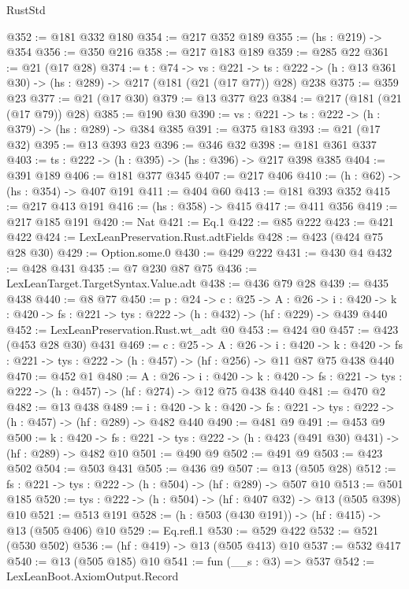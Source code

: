 \begin{lexlean}{RustStd}
\begin{coremodule}
@352 := @181 @332 @180
@354 := @217 @352 @189
@355 := (hs : @219) -> @354
@356 := @350 @216
@358 := @217 @183 @189
@359 := @285 @22
@361 := @21 (@17 @28)
@374 := {t : @74} ->
  {vs : @221} ->
  {ts : @222} -> (h : @13 @361 @30) -> (hs : @289) -> @217 (@181 (@21 (@17 @77)) @28) @238
@375 := @359 @23
@377 := @21 (@17 @30)
@379 := @13 @377 @23
@384 := @217 (@181 (@21 (@17 @79)) @28)
@385 := @190 @30
@390 := {vs : @221} -> {ts : @222} -> (h : @379) -> (hs : @289) -> @384 @385
@391 := @375 @183
@393 := @21 (@17 @32)
@395 := @13 @393 @23
@396 := @346 @32
@398 := @181 @361 @337
@403 := {ts : @222} -> (h : @395) -> (hs : @396) -> @217 @398 @385
@404 := @391 @189
@406 := @181 @377 @345
@407 := @217 @406
@410 := (h : @62) -> (hs : @354) -> @407 @191
@411 := @404 @60
@413 := @181 @393 @352
@415 := @217 @413 @191
@416 := (hs : @358) -> @415
@417 := @411 @356
@419 := @217 @185 @191
@420 := Nat
@421 := Eq.{1}
@422 := @85 @222
@423 := @421 @422
@424 := LexLeanPreservation.Rust.adtFields
@428 := @423 (@424 @75 @28 @30)
@429 := Option.some.{0}
@430 := @429 @222
@431 := @430 @4
@432 := @428 @431
@435 := @7 @230 @87 @75
@436 := LexLeanTarget.TargetSyntax.Value.adt
@438 := @436 @79 @28
@439 := @435 @438
@440 := @8 @77
@450 := {p : @24} ->
  {c : @25} ->
  {A : @26} ->
  {i : @420} -> {k : @420} -> {fs : @221} -> {tys : @222} -> (h : @432) -> (hf : @229) -> @439 @440
@452 := LexLeanPreservation.Rust.wt_adt @0
@453 := @424 @0
@457 := @423 (@453 @28 @30) @431
@469 := {c : @25} ->
  {A : @26} ->
  {i : @420} ->
  {k : @420} -> {fs : @221} -> {tys : @222} -> (h : @457) -> (hf : @256) -> @11 @87 @75 @438 @440
@470 := @452 @1
@480 := {A : @26} ->
  {i : @420} ->
  {k : @420} -> {fs : @221} -> {tys : @222} -> (h : @457) -> (hf : @274) -> @12 @75 @438 @440
@481 := @470 @2
@482 := @13 @438
@489 := {i : @420} ->
  {k : @420} -> {fs : @221} -> {tys : @222} -> (h : @457) -> (hf : @289) -> @482 @440
@490 := @481 @9
@491 := @453 @9
@500 := {k : @420} ->
  {fs : @221} -> {tys : @222} -> (h : @423 (@491 @30) @431) -> (hf : @289) -> @482 @10
@501 := @490 @9
@502 := @491 @9
@503 := @423 @502
@504 := @503 @431
@505 := @436 @9
@507 := @13 (@505 @28)
@512 := {fs : @221} -> {tys : @222} -> (h : @504) -> (hf : @289) -> @507 @10
@513 := @501 @185
@520 := {tys : @222} -> (h : @504) -> (hf : @407 @32) -> @13 (@505 @398) @10
@521 := @513 @191
@528 := (h : @503 (@430 @191)) -> (hf : @415) -> @13 (@505 @406) @10
@529 := Eq.refl.{1}
@530 := @529 @422
@532 := @521 (@530 @502)
@536 := (hf : @419) -> @13 (@505 @413) @10
@537 := @532 @417
@540 := @13 (@505 @185) @10
@541 := fun (__s : @3) => @537
@542 := LexLeanBoot.AxiomOutput.Record

\end{coremodule}
\end{lexlean}
